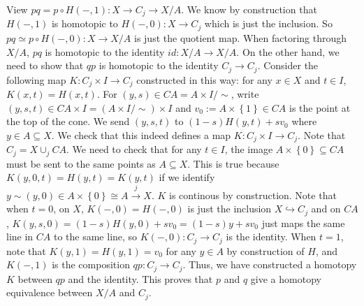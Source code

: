 \documentclass[a4paper, 12pt]{article}
\begin{document}
\begin{solution}
View \(pq=p\circ H(-,1):X\rightarrow C_j\rightarrow X/A\). We know by construction that \(H(-,1)\) is homotopic to \(H(-,0):X\rightarrow C_j\) which is just the inclusion. So \(pq\simeq p\circ H(-,0):X\rightarrow X/A\) is just the quotient map. When 
factoring through \(X/A\), \(pq\) is homotopic to the identity \(id:X/A\rightarrow X/A\). On the other hand, we need to show that \(qp\) is homotopic to the identity \(C_j\rightarrow C_j\). Consider the following map \(K:C_j\times I\rightarrow C_j\) constructed in this way: 
for any \(x\in X\) and \(t\in I\), \(K(x,t)=H(x,t)\). For \((y,s)\in CA=A\times I/\sim\), write \((y,s,t)\in CA\times I=(A\times I/\sim)\times I\) and \(v_0:=A\times \left\{ 1 \right\}\in CA\) is the point at the top of the cone. 
We send \((y,s,t)\) to \((1-s)H(y,t)+sv_0\) where \(y\in A\subseteq X\). We check that this indeed defines a map \(K:C_j\times I\rightarrow C_j\). Note that \(C_j=X\cup_j CA\). We need to check that for any \(t\in I\), the image \(A\times \left\{ 0 \right\}\subseteq CA\) must be sent to the 
same points as \(A\subseteq X\). This is true because \(K(y,0,t)=H(y,t)=K(y,t)\) if we identify  \(y\sim (y,0)\in A\times \left\{ 0 \right\}\cong A\xrightarrow{j}X\). \(K\) is continous by construction. Note that when \(t=0\), on \(X\), \(K(-,0)=H(-,0)\) is just the inclusion \(X\hookrightarrow C_j\) and 
on \(CA\), \(K(y,s,0)=(1-s)H(y,0)+sv_0=(1-s)y+sv_0\) just maps the same line in \(CA\) to the same line, so \(K(-,0):C_j\rightarrow C_j\) is the identity. When \(t=1\), note that \(K(y,1)=H(y,1)=v_0\) for any \(y\in A\) by construction of \(H\), and \(K(-,1)\) is the composition \(qp:C_j\rightarrow C_j\). Thus, 
we have constructed a homotopy \(K\) between \(qp\) and the identity. This proves that \(p\) and \(q\) give a homotopy equivalence between \(X/A\) and \(C_j\).
\end{solution}
\end{document}
